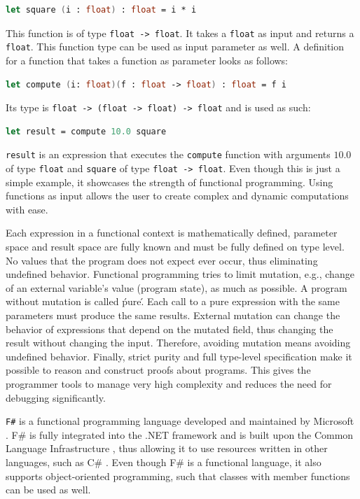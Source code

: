 \begin{lstlisting}[language=FSharp]
let square (i : float) : float = i * i 
\end{lstlisting}

This function is of type \verb|float -> float|. It takes a \verb|float| as input and returns a \verb|float|. This function type can be used as input parameter as well. A definition for a function that takes a function as parameter looks as follows: 

\begin{lstlisting}[language=FSharp]
let compute (i: float)(f : float -> float) : float = f i
\end{lstlisting}
Its type is \verb|float -> (float -> float) -> float| and is used as such: 
\begin{lstlisting}[language=FSharp]
let result = compute 10.0 square
\end{lstlisting}

\verb|result| is an expression that executes the \verb|compute| function with arguments $10.0$ of type \verb|float| and \verb|square| of type \verb|float -> float|. Even though this is just a simple example, it showcases the strength of functional programming.  Using functions as input allows the user to create complex and dynamic computations with ease. 

\par

Each expression in a functional context is mathematically defined, parameter space and result space are fully known and must be fully defined on type level. No values that the program does not expect ever occur, thus eliminating undefined behavior. 
Functional programming tries to limit mutation, e.g., change of an external variable's value (program state), as much as possible. A program without mutation is called \'pure\'. Each call to a pure expression with the same parameters must produce the same results. External mutation can change the behavior of expressions that depend on the mutated field, thus changing the result without changing the input. Therefore, avoiding mutation means avoiding undefined behavior.
Finally, strict purity and full type-level specification make it possible to reason and construct proofs about programs. This gives the programmer tools to manage very high complexity and reduces the need for debugging significantly.

\par

\verb|F#| \cite{FSharp} is a functional programming language developed and maintained by Microsoft \cite{Microsoft}. F\# is fully integrated into the .NET framework \cite{DotNet} and is built upon the Common Language Infrastructure \cite{CLI}, thus allowing it to use resources written in other languages, such as C\# \cite{CSharp}. Even though F\# is a functional language, it also supports object-oriented programming, such that classes with member functions can be used as well. 


